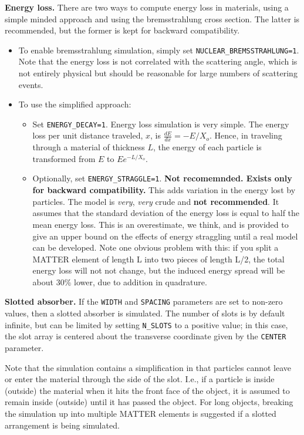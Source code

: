 {\bf Energy loss.} There are two ways to compute energy loss in materials, using a simple minded approach and using the bremsstrahlung cross section.
The latter is recommended, but the former is kept for backward compatibility. 
\begin{itemize}
\item To enable bremsstrahlung simulation, simply set \verb|NUCLEAR_BREMSSTRAHLUNG=1|. Note that the energy loss is not correlated with the scattering
  angle, which is not entirely physical but should be reasonable for large numbers of scattering events.
\item To use the simplified approach:
      \begin{itemize}
      \item  Set \verb|ENERGY_DECAY=1|. Energy loss simulation is very simple.
The energy loss per unit distance traveled, $x$, is 
$\frac{dE}{dx} = -E/X_o$.  Hence, in traveling through a
material of thickness $L$, the energy of each particle is
transformed from $E$ to $E e^{-L/X_o}$.  
       \item Optionally, set \verb|ENERGY_STRAGGLE=1|. {\bf Not recomemnded. Exists only for backward compatibility.}
This adds variation in the energy lost
by particles.  The model is {\em very}, {\em very} crude and {\bf not recommended}.  It assumes that the standard deviation of the energy
loss is equal to half the mean energy loss.  This is an overestimate,
we think, and is provided to give an upper bound on the effects of
energy straggling until a real model can be developed.  Note one
obvious problem with this: if you split a MATTER element of length L
into two pieces of length L/2, the total energy loss will not not
change, but the induced energy spread will be about 30\% lower, due to
addition in quadrature.
\end{itemize}
\end{itemize}

{\bf Slotted absorber.} If the \verb|WIDTH| and \verb|SPACING| parameters are set to non-zero values, then a 
slotted absorber is simulated. The number of slots is by default infinite, but can be limited by setting
\verb|N_SLOTS| to a positive value; in this case, the slot array is centered about the transverse coordinate
given by the \verb|CENTER| parameter.

Note that the simulation contains a simplification in that particles cannot leave or enter the material
through the side of the slot. I.e., if a particle is inside (outside) the material when it hits the
front face of the object, it is assumed to remain inside (outside) until it has passed the object.
For long objects, breaking the simulation up into multiple MATTER elements is suggested if
a slotted arrangement is being simulated.

